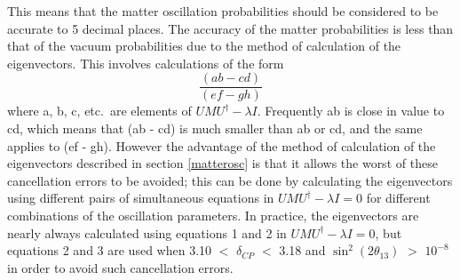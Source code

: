 This means that the matter oscillation probabilities should be considered to be accurate to 5 decimal places. The accuracy of the matter probabilities 
is less than that of the vacuum probabilities due to the method of calculation of the eigenvectors. This involves calculations of the form 
\begin{displaymath}
\frac{(ab - cd)}{(ef - gh)}
\end{displaymath} 
where a, b, c, etc.\ are elements of $U M U^{\dagger} - \lambda I$. Frequently ab is close in value to cd, which means that (ab - cd) is much smaller than ab or 
cd, and the same applies to (ef - gh). However the advantage of the method of calculation of the eigenvectors described in section \ref{matterosc} is that it allows 
the worst of these cancellation errors to be avoided; this can be done by calculating the eigenvectors using different pairs of simultaneous equations in 
$U M U^{\dagger} - \lambda I = 0$ for different combinations of the oscillation parameters. In practice, the eigenvectors are nearly always calculated 
using equations 1 and 2 in $U M U^{\dagger} - \lambda I = 0$, but equations 2 and 3 are used when 3.10 $<$ $\delta_{CP}$ $<$ 3.18 and 
$\sin^{2}(2 \theta_{13})$ $>$ $10^{-8}$ in order to avoid such cancellation errors.  





